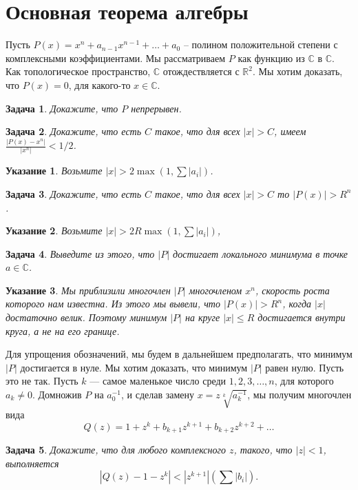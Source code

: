 \documentclass[12pt]{book}
\newcommand{\subs}{\section}
\def\R{{\mathbb R}}
\def\C{{\mathbb C}}
\theoremstyle{upshape}
\newtheorem{zadacha}{Задача}[chapter]
\theoremstyle{generic}
\def\еза{\end{remark}}
\theoremstyle{upshapenonumber}
\newtheorem{ukazanie}{Указание}[section]
\newcommand{\следствие}{%
     \refstepcounter{teorema}
     {\noindent\bf Следствие \thechapter.\arabic{teorema}:\ }}
\newcommand{\пример}{%
     \refstepcounter{teorema}
     {\noindent\bf Пример \thechapter.\arabic{teorema}:\ }}
\newcommand{\лемма}{%
     \refstepcounter{teorema}
     {\noindent\bf Лемма \thechapter.\arabic{teorema}:\ }}
\newcommand{\теорема}{%
     \refstepcounter{teorema}
     {\noindent\bf Теорема \thechapter.\arabic{teorema}:\ }}
\newcommand{\утверждение}{%
     \refstepcounter{teorema}
     {\noindent\bf Утверждение \thechapter.\arabic{teorema}:\ }}
\def\ем{\em}
\def\ез{\end{zadacha}}
\def\указание{\begin{ukazanie}}
\def\еу{\end{ukazanie}}
\def\ео{\end{opredelenie}}
\def\енум{\begin{enumerate}}
\def\ее{\end{enumerate}}
\begin{document}
{%
\subs{Основная теорема алгебры}


Пусть $P(x)= x^n + a_{n-1} x^{n-1} + \dots + a_0 $ --
полином 
положительной степени с комплексными коэффициентами. 
Мы рассматриваем $P$ как функцию из
$\C$ в $\C$. Как топологическое пространство, $\C$
отождествляется с $\R^2$. Мы хотим доказать, что
$P(x)=0$, для какого-то $x\in \C$.

\begin{zadacha}
Докажите, что $P$ непрерывен.
\end{zadacha}

\begin{zadacha}
Докажите, что есть $C$ такое, что для всех $|x| > C$, имеем
$\frac{|P(x)-x^n|}{|x^n|} <1/2$. 
\end{zadacha}

\указание
Возьмите $|x|> 2\max \left(1, \sum |a_i|\right)$.
\еу

\begin{zadacha}
Докажите, что есть $C$ такое, что для всех $|x| > C$
то $|P(x)| > R^n$.
\end{zadacha}

\указание
Возьмите
$|x|> 2R \max \left(1, \sum |a_i|\right)$,
\еу

\begin{zadacha}
Выведите из этого, что $|P|$ достигает 
локального минимума в точке $a\in \C$.
\end{zadacha}

\begin{ukazanie}
Мы приблизили многочлен $|P|$ многочленом $x^n$,
скорость роста которого нам известна.
Из этого мы вывели, что $|P(x)|>  R^n$,
когда $|x|$ достаточно велик.
Поэтому минимум $|P|$ на круге $|x|\leq R$
достигается внутри круга, а не на
его границе.
\end{ukazanie}

Для упрощения обозначений, мы будем в дальнейшем
предполагать, что минимум $|P|$ достигается в нуле.
Мы хотим доказать,
  что минимум $|P|$ равен нулю. Пусть это не
  так. Пусть $k$ --- самое маленькое число
  среди $1, 2, 3, \dots, n$, для которого $a_k\neq 0$.
  Домножив $P$ на $a_0^{-1}$, и сделав замену
  $x=z\sqrt[k]{a_k^{-1}}$, мы получим многочлен вида
 \[ Q(z) = 1 + z^k + b_{k+1} z^{k+1} + b_{k+2} z^{k+2} + \dots \]

\begin{zadacha}
       Докажите, что для любого
       комплексного $z$, такого, что $|z|< 1$, выполняется
       \[
       |Q(z)-1-z^k| < |z^{k+1}|\left (\sum |b_i|\right).
       \]
       \end{zadacha}

}
\end{document}
